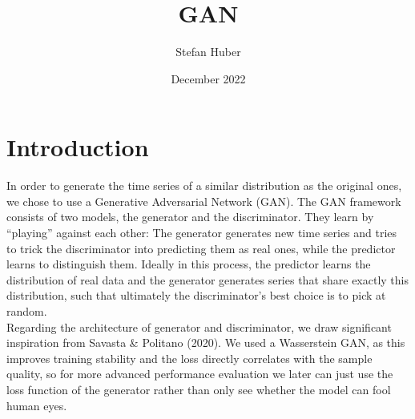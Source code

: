 \documentclass{article}
\title{GAN}
\author{Stefan Huber}
\date{December 2022}
\begin{document}
\maketitle
\section{Introduction}
In order to generate the time series of a similar distribution as the original ones, we chose to use a Generative Adversarial Network (GAN). The GAN framework consists of two models, the generator and the discriminator. They learn by “playing” against each other: The generator generates new time series and tries to trick the discriminator into predicting them as real ones, while the predictor learns to distinguish them. Ideally in this process, the predictor learns the distribution of real data and the generator generates series that share exactly this distribution, such that ultimately the discriminator's best choice is to pick at random. \\
Regarding the architecture of generator and discriminator, we draw significant inspiration from Savasta \& Politano (2020). We used a Wasserstein GAN, as this improves training stability and the loss directly correlates with the sample quality, so for more advanced performance evaluation we later can just use the loss function of the generator rather than only see whether the model can fool human eyes.
\end{document}
